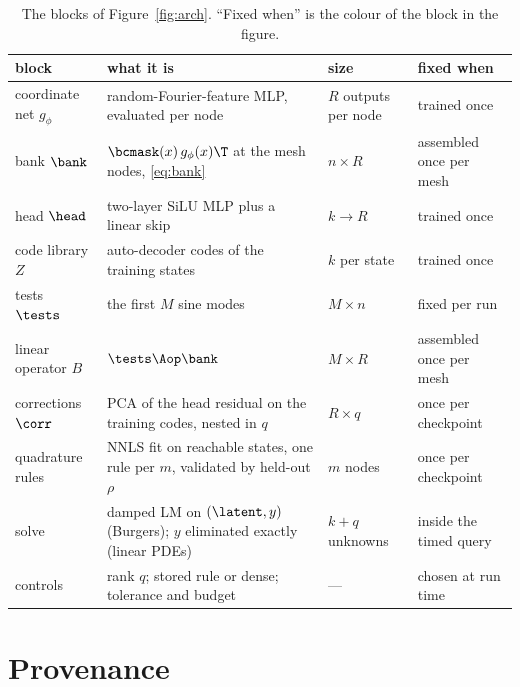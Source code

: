 \begin{table}[h]
\centering
\caption{The blocks of Figure~\ref{fig:arch}. ``Fixed when'' is the colour of
the block in the figure.}
\label{tab:arch-blocks}
{\scriptsize
\begin{tabular}{llll}
\toprule
block & what it is & size & fixed when \\
\midrule
coordinate net $g_\phi$ & random-Fourier-feature MLP, evaluated per node & $R$ outputs per node & trained once \\
bank $\bank$ & $\bcmask(x)\,g_\phi(x)\T$ at the mesh nodes, \eqref{eq:bank} & $n\times R$ & assembled once per mesh \\
head $\head$ & two-layer SiLU MLP plus a linear skip & $k\to R$ & trained once \\
code library $Z$ & auto-decoder codes of the training states & $k$ per state & trained once \\
tests $\tests$ & the first $M$ sine modes & $M\times n$ & fixed per run \\
linear operator $B$ & $\tests\Aop\bank$ & $M\times R$ & assembled once per mesh \\
corrections $\corr$ & PCA of the head residual on the training codes, nested in $q$ & $R\times q$ & once per checkpoint \\
quadrature rules & NNLS fit on reachable states, one rule per $m$, validated by held-out $\rho$ & $m$ nodes & once per checkpoint \\
solve & damped LM on $(\latent,y)$ (Burgers); $y$ eliminated exactly (linear PDEs) & $k+q$ unknowns & inside the timed query \\
controls & rank $q$; stored rule or dense; tolerance and budget & --- & chosen at run time \\
\bottomrule
\end{tabular}}
\end{table}

\section{Provenance}
\label{app:provenance}

\begin{table}[h]
\centering
\caption{Provenance of every result table: job id, GPU, source commit and
checkpoint. The SHA256 of every machine-readable file the generator read is in
\texttt{tables/provenance.json}. Every job asserted \texttt{jax\_backend=gpu},
float64 and highest matmul precision before doing any work.}
\label{tab:provenance}
\resizebox{\linewidth}{!}{}
\end{table}

